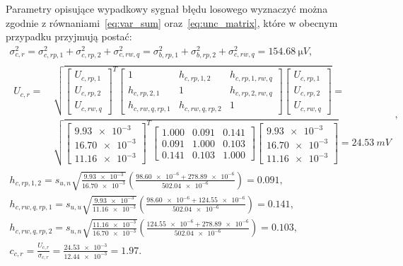 Parametry opisujące wypadkowy sygnał błędu losowego wyznaczyć można zgodnie z równaniami~\eqref{eq:var_sum} oraz~\eqref{eq:unc_matrix}, które w obecnym przypadku przyjmują postać:
\begin{gather}
\sigma_{c,r}^{2} = \sigma_{c,rp,1}^{2} + \sigma_{c,rp,2}^{2} + \sigma_{c,rw,q}^{2} = \sigma_{b,rp,1}^{2} + \sigma_{b,rp,2}^{2} + \sigma_{c,rw,q}^{2} = \qty{154.68}{\micro V} \label{eq:sym_partc_rand_var}, \\
\begin{split}
U_{c,r} = ~ & \sqrt{
\begin{bmatrix}
U_{c,rp,1} \\ U_{c,rp,2} \\ U_{c,rw,q}
\end{bmatrix}^{T}
\begin{bmatrix}
1               & h_{c,rp,1,2}    & h_{c,rp,1,rw,q} \\
h_{c,rp,2,1}    & 1               & h_{c,rp,2,rw,q} \\
h_{c,rw,q,rp,1} & h_{c,rw,q,rp,2} & 1
\end{bmatrix}
\begin{bmatrix}
U_{c,rp,1} \\ U_{c,rp,2} \\ U_{c,rw,q}
\end{bmatrix}} = ~ \\ & \sqrt{
\begin{bmatrix}
\num{9.93e-3} \\ \num{16.70e-3} \\ \num{11.16e-3}
\end{bmatrix}^{T}
\begin{bmatrix}
\num{1.000} & \num{0.091} & \num{0.141} \\
\num{0.091} & \num{1.000} & \num{0.103} \\
\num{0.141} & \num{0.103} & \num{1.000}
\end{bmatrix}
\begin{bmatrix}
\num{9.93e-3} \\ \num{16.70e-3} \\ \num{11.16e-3}
\end{bmatrix}} = \qty{24.53}{mV}
\end{split}
\label{eq:sym_partc_rand_uncert}, \\
h_{c,rp,1,2} = s_{u,n} \sqrt{\frac{\num{9.93e-3}}{\num{16.70e-3}}} \left( \frac{\num{98.60e-6} + \num{278.89e-6}}{\num{502.04e-6}} \right) = \num{0.091} \label{eq:sym_partc_coher_rp_1_2}, \\
h_{c,rw,q,rp,1} = s_{u,u} \sqrt{\frac{\num{9.93e-3}}{\num{11.16e-3}}} \left( \frac{\num{98.60e-6} + \num{124.55e-6}}{\num{502.04e-6}} \right) = \num{0.141} \label{eq:sym_partc_coher_q_rp_1}, \\
h_{c,rw,q,rp,2} = s_{u,n} \sqrt{\frac{\num{11.16e-3}}{\num{16.70e-3}}} \left( \frac{\num{124.55e-6} + \num{278.89e-6}}{\num{502.04e-6}} \right) = \num{0.103} \label{eq:sym_partc_coher_q_rp_2}, \\
c_{c,r} = \frac{U_{c,r}}{\sigma_{c,r}} = \frac{\num{24.53e-3}}{\num{12.44e-3}} = \num{1.97} \label{eq:sym_partc_rand_factor}.
\end{gather}

